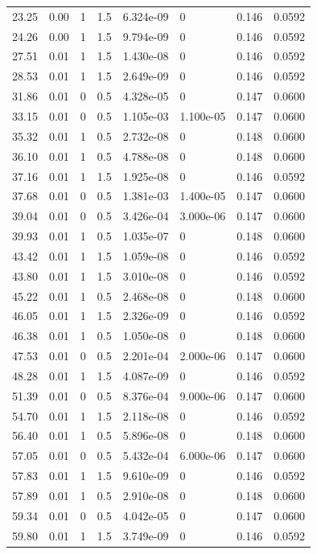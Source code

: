 \documentclass[preview]{standalone}
\begin{document}
{{\begin{tabular}{L{1.2cm}C{1.2cm} C{0.3cm}C{0.5cm} C{1.4cm}C{1.4cm} C{1.4cm}C{1.4cm}}
  23.25  &  0.00  & 1     & 1.5 &  6.324e-09  & 0  & 0.146 &  0.0592   \\ 
  24.26  &  0.00  & 1     & 1.5 &  9.794e-09  & 0  & 0.146 &  0.0592   \\ 
  27.51  &  0.01  & 1     & 1.5 &  1.430e-08  & 0  & 0.146 &  0.0592   \\ 
  28.53  &  0.01  & 1     & 1.5 &  2.649e-09  & 0  & 0.146 &  0.0592   \\ 
  31.86  &  0.01  & 0     & 0.5 &  4.328e-05  & 0  & 0.147 &  0.0600   \\ 
  33.15  &  0.01  & 0     & 0.5 &  1.105e-03  & 1.100e-05  & 0.147 &  0.0600   \\ 
  35.32  &  0.01  & 1     & 0.5 &  2.732e-08  & 0  & 0.148 &  0.0600   \\ 
  36.10  &  0.01  & 1     & 0.5 &  4.788e-08  & 0  & 0.148 &  0.0600   \\ 
  37.16  &  0.01  & 1     & 1.5 &  1.925e-08  & 0  & 0.146 &  0.0592   \\ 
  37.68  &  0.01  & 0     & 0.5 &  1.381e-03  & 1.400e-05  & 0.147 &  0.0600   \\ 
  39.04  &  0.01  & 0     & 0.5 &  3.426e-04  & 3.000e-06  & 0.147 &  0.0600   \\ 
  39.93  &  0.01  & 1     & 0.5 &  1.035e-07  & 0  & 0.148 &  0.0600   \\ 
  43.42  &  0.01  & 1     & 1.5 &  1.059e-08  & 0  & 0.146 &  0.0592   \\ 
  43.80  &  0.01  & 1     & 1.5 &  3.010e-08  & 0  & 0.146 &  0.0592   \\ 
  45.22  &  0.01  & 1     & 0.5 &  2.468e-08  & 0  & 0.148 &  0.0600   \\ 
  46.05  &  0.01  & 1     & 1.5 &  2.326e-09  & 0  & 0.146 &  0.0592   \\ 
  46.38  &  0.01  & 1     & 0.5 &  1.050e-08  & 0  & 0.148 &  0.0600   \\ 
  47.53  &  0.01  & 0     & 0.5 &  2.201e-04  & 2.000e-06  & 0.147 &  0.0600   \\ 
  48.28  &  0.01  & 1     & 1.5 &  4.087e-09  & 0  & 0.146 &  0.0592   \\ 
  51.39  &  0.01  & 0     & 0.5 &  8.376e-04  & 9.000e-06  & 0.147 &  0.0600   \\ 
  54.70  &  0.01  & 1     & 1.5 &  2.118e-08  & 0  & 0.146 &  0.0592   \\ 
  56.40  &  0.01  & 1     & 0.5 &  5.896e-08  & 0  & 0.148 &  0.0600   \\ 
  57.05  &  0.01  & 0     & 0.5 &  5.432e-04  & 6.000e-06  & 0.147 &  0.0600   \\ 
  57.83  &  0.01  & 1     & 1.5 &  9.610e-09  & 0  & 0.146 &  0.0592   \\ 
  57.89  &  0.01  & 1     & 0.5 &  2.910e-08  & 0  & 0.148 &  0.0600   \\ 
  59.34  &  0.01  & 0     & 0.5 &  4.042e-05  & 0  & 0.147 &  0.0600   \\ 
  59.80  &  0.01  & 1     & 1.5 &  3.749e-09  & 0  & 0.146 &  0.0592   \\ 
\hline 
\end{tabular} 

}}
\end{document}

